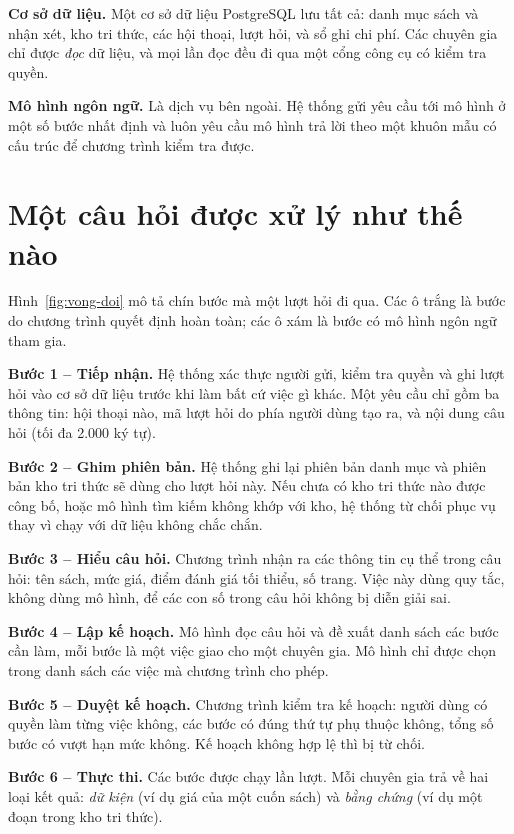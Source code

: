 \textbf{Cơ sở dữ liệu.} Một cơ sở dữ liệu PostgreSQL lưu tất cả: danh mục sách và nhận xét, kho tri thức, các hội thoại, lượt hỏi, và sổ ghi chi phí. Các chuyên gia chỉ được \emph{đọc} dữ liệu, và mọi lần đọc đều đi qua một cổng công cụ có kiểm tra quyền.

\textbf{Mô hình ngôn ngữ.} Là dịch vụ bên ngoài. Hệ thống gửi yêu cầu tới mô hình ở một số bước nhất định và luôn yêu cầu mô hình trả lời theo một khuôn mẫu có cấu trúc để chương trình kiểm tra được.

\section{Một câu hỏi được xử lý như thế nào}
\label{sec:vong-doi}

Hình~\ref{fig:vong-doi} mô tả chín bước mà một lượt hỏi đi qua. Các ô trắng là bước do chương trình quyết định hoàn toàn; các ô xám là bước có mô hình ngôn ngữ tham gia.


\textbf{Bước 1 -- Tiếp nhận.} Hệ thống xác thực người gửi, kiểm tra quyền và ghi lượt hỏi vào cơ sở dữ liệu trước khi làm bất cứ việc gì khác. Một yêu cầu chỉ gồm ba thông tin: hội thoại nào, mã lượt hỏi do phía người dùng tạo ra, và nội dung câu hỏi (tối đa 2.000 ký tự).

\textbf{Bước 2 -- Ghim phiên bản.} Hệ thống ghi lại phiên bản danh mục và phiên bản kho tri thức sẽ dùng cho lượt hỏi này. Nếu chưa có kho tri thức nào được công bố, hoặc mô hình tìm kiếm không khớp với kho, hệ thống từ chối phục vụ thay vì chạy với dữ liệu không chắc chắn.

\textbf{Bước 3 -- Hiểu câu hỏi.} Chương trình nhận ra các thông tin cụ thể trong câu hỏi: tên sách, mức giá, điểm đánh giá tối thiểu, số trang. Việc này dùng quy tắc, không dùng mô hình, để các con số trong câu hỏi không bị diễn giải sai.

\textbf{Bước 4 -- Lập kế hoạch.} Mô hình đọc câu hỏi và đề xuất danh sách các bước cần làm, mỗi bước là một việc giao cho một chuyên gia. Mô hình chỉ được chọn trong danh sách các việc mà chương trình cho phép.

\textbf{Bước 5 -- Duyệt kế hoạch.} Chương trình kiểm tra kế hoạch: người dùng có quyền làm từng việc không, các bước có đúng thứ tự phụ thuộc không, tổng số bước có vượt hạn mức không. Kế hoạch không hợp lệ thì bị từ chối.

\textbf{Bước 6 -- Thực thi.} Các bước được chạy lần lượt. Mỗi chuyên gia trả về hai loại kết quả: \emph{dữ kiện} (ví dụ giá của một cuốn sách) và \emph{bằng chứng} (ví dụ một đoạn trong kho tri thức).

